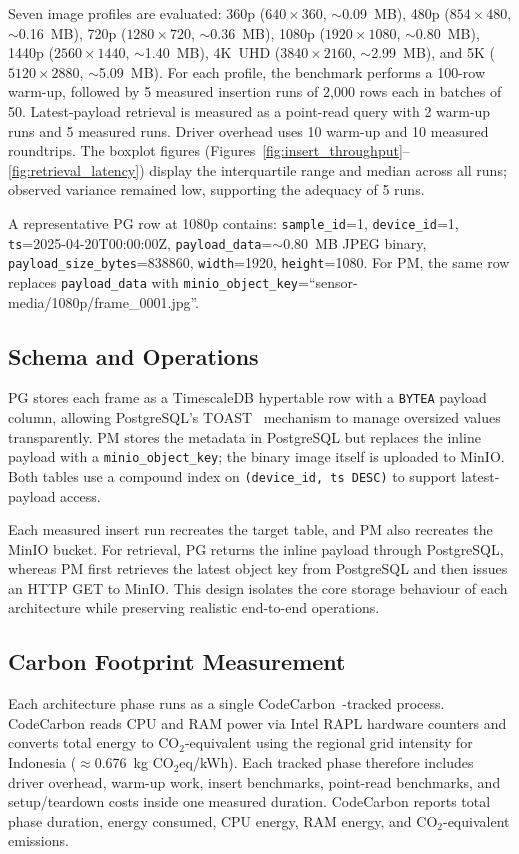\documentclass[conference]{IEEEtran}
\begin{document}
Seven image profiles are evaluated: 360p ($640{\times}360$, $\sim$0.09~MB), 480p ($854{\times}480$, $\sim$0.16~MB), 720p ($1280{\times}720$, $\sim$0.36~MB), 1080p ($1920{\times}1080$, $\sim$0.80~MB), 1440p ($2560{\times}1440$, $\sim$1.40~MB), 4K~UHD ($3840{\times}2160$, $\sim$2.99~MB), and 5K ($5120{\times}2880$, $\sim$5.09~MB). For each profile, the benchmark performs a 100-row warm-up, followed by 5 measured insertion runs of 2,000 rows each in batches of 50. Latest-payload retrieval is measured as a point-read query with 2 warm-up runs and 5 measured runs. Driver overhead uses 10 warm-up and 10 measured roundtrips. The boxplot figures (Figures~\ref{fig:insert_throughput}--\ref{fig:retrieval_latency}) display the interquartile range and median across all runs; observed variance remained low, supporting the adequacy of 5 runs.

A representative PG row at 1080p contains: \texttt{sample\_id}=1, \texttt{device\_id}=1, \texttt{ts}=2025-04-20T00:00:00Z, \texttt{payload\_data}=$\sim$0.80~MB JPEG binary, \texttt{payload\_size\_bytes}=838860, \texttt{width}=1920, \texttt{height}=1080. For PM, the same row replaces \texttt{payload\_data} with \texttt{minio\_object\_key}=``sensor-media/1080p/frame\_0001.jpg''.

\subsection{Schema and Operations}
PG stores each frame as a TimescaleDB hypertable row with a \texttt{BYTEA} payload column, allowing PostgreSQL's TOAST~\cite{postgresql_toast_docs} mechanism to manage oversized values transparently. PM stores the metadata in PostgreSQL but replaces the inline payload with a \texttt{minio\_object\_key}; the binary image itself is uploaded to MinIO. Both tables use a compound index on \texttt{(device\_id, ts DESC)} to support latest-payload access.

Each measured insert run recreates the target table, and PM also recreates the MinIO bucket. For retrieval, PG returns the inline payload through PostgreSQL, whereas PM first retrieves the latest object key from PostgreSQL and then issues an HTTP GET to MinIO. This design isolates the core storage behaviour of each architecture while preserving realistic end-to-end operations.

\subsection{Carbon Footprint Measurement}
Each architecture phase runs as a single CodeCarbon~\cite{codecarbon}-tracked process. CodeCarbon reads CPU and RAM power via Intel RAPL hardware counters and converts total energy to CO$_2$-equivalent using the regional grid intensity for Indonesia ($\approx$0.676~kg CO$_2$eq/kWh). Each tracked phase therefore includes driver overhead, warm-up work, insert benchmarks, point-read benchmarks, and setup/teardown costs inside one measured duration. CodeCarbon reports total phase duration, energy consumed, CPU energy, RAM energy, and CO$_2$-equivalent emissions.
\end{document}
